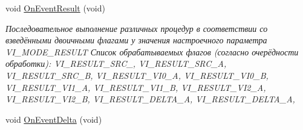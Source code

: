\begin{DoxyCompactItemize}
void \hyperlink{class_c_v_i_engine_thread_a59da3179cc28387c9ebe468cdb33bcb1}{On\+Event\+Result} (void)
\begin{DoxyCompactList}\small\item\em Последовательное выполнение различных процедур в соответствии со взведёнными двоичными флагами у значения настроечного параметра V\+I\+\_\+\+M\+O\+D\+E\+\_\+\+R\+E\+S\+U\+L\+T Список обрабатываемых флагов (согласно очерёдности обработки)\+: V\+I\+\_\+\+R\+E\+S\+U\+L\+T\+\_\+\+S\+R\+C\+\_, V\+I\+\_\+\+R\+E\+S\+U\+L\+T\+\_\+\+S\+R\+C\+\_\+\+A, V\+I\+\_\+\+R\+E\+S\+U\+L\+T\+\_\+\+S\+R\+C\+\_\+\+B, V\+I\+\_\+\+R\+E\+S\+U\+L\+T\+\_\+\+V\+I0\+\_\+\+A, V\+I\+\_\+\+R\+E\+S\+U\+L\+T\+\_\+\+V\+I0\+\_\+\+B, V\+I\+\_\+\+R\+E\+S\+U\+L\+T\+\_\+\+V\+I1\+\_\+\+A, V\+I\+\_\+\+R\+E\+S\+U\+L\+T\+\_\+\+V\+I1\+\_\+\+B, V\+I\+\_\+\+R\+E\+S\+U\+L\+T\+\_\+\+V\+I2\+\_\+\+A, V\+I\+\_\+\+R\+E\+S\+U\+L\+T\+\_\+\+V\+I2\+\_\+\+B, V\+I\+\_\+\+R\+E\+S\+U\+L\+T\+\_\+\+D\+E\+L\+T\+A\+\_\+\+A, V\+I\+\_\+\+R\+E\+S\+U\+L\+T\+\_\+\+D\+E\+L\+T\+A\+\_\+\+A, \end{DoxyCompactList}\item 
void \hyperlink{class_c_v_i_engine_thread_ae5c43326cf2db88c2233f60412113e14}{On\+Event\+Delta} (void)

\end{DoxyCompactItemize}
